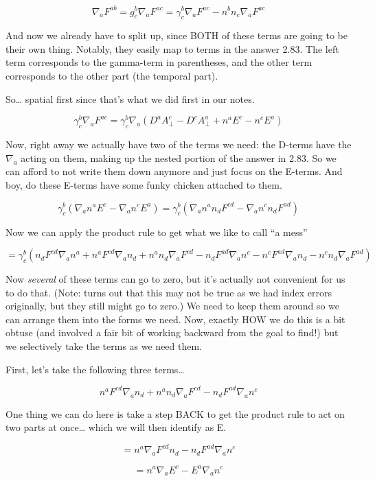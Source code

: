 \documentclass[landscape,letterpaper,10pt,english]{article}
\begin{document}
\[\nabla_a F^{ab} = g^b_c \nabla_a F^{ac} = \gamma^b_c \nabla_a F^{ac} - n^bn_c\nabla_aF^{ac}\]

And now we already have to split up, since BOTH of these terms are going
to be their own thing. Notably, they easily map to terms in the answer
2.83. The left term corresponds to the gamma-term in parentheses, and
the other term corresponds to the other part (the temporal part).

So\ldots{} spatial first since that's what we did first in our notes.

    \[\gamma^b_c \nabla_a F^{ac} = \gamma^b_c \nabla_a (D^a A_\perp^c - D^c A_\perp^a + n^aE^c - n^cE^a)\]

Now, right away we actually have two of the terms we need: the D-terms
have the \(\nabla_a\) acting on them, making up the nested portion of
the answer in 2.83. So we can afford to not write them down anymore and
just focus on the E-terms. And boy, do these E-terms have some funky
chicken attached to them.

\[ \gamma^b_c (\nabla_a n^aE^c - \nabla_a n^cE^a) = \gamma^b_c (\nabla_a n^a n_d F^{cd} - \nabla_a n^c n_d F^{ad}) \]

Now we can apply the product rule to get what we like to call ``a mess''

\[ = \gamma^b_c ( n_d F^{cd}\nabla_an^a + n^a F^{cd}\nabla_a n_d + n^a n_d \nabla_aF^{cd} - n_d F^{ad} \nabla_a n^c - n^c F^{ad} \nabla_a n_d - n^c n_d \nabla_a F^{ad}) \]

Now \emph{several} of these terms can go to zero, but it's actually not
convenient for us to do that. (Note: turns out that this may not be true
as we had index errors originally, but they still might go to zero.) We
need to keep them around so we can arrange them into the forms we need.
Now, exactly HOW we do this is a bit obtuse (and involved a fair bit of
working backward from the goal to find!) but we selectively take the
terms as we need them.

First, let's take the following three terms\ldots{}

\[ n^a F^{cd}\nabla_a n_d + n^a n_d \nabla_aF^{cd} - n_d F^{ad} \nabla_a n^c \]

One thing we can do here is take a step BACK to get the product rule to
act on two parts at once\ldots{} which we will then identify as E.

\[ = n^a \nabla_a F^{cd} n_d - n_d F^{ad} \nabla_a n^c \]

\[ = n^a \nabla_a E^c - E^a \nabla_a n^c \]
\end{document}
